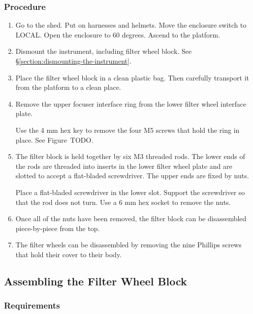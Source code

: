 \subsubsection{Procedure}

\begin{enumerate}

    \item Go to the shed. Put on harnesses and helmets. Move the enclosure switch to LOCAL. Open the enclosure to 60 degrees. Ascend to the platform.

    \item Dismount the instrument, including filter wheel block. See \S\ref{section:dismounting-the-instrument}.

   \item Place the filter wheel block in a clean plastic bag. Then carefully transport it from the platform to a clean place.
   
   \item Remove the upper focuser interface ring from the lower filter wheel interface plate. 
   
   Use the 4 mm hex key to remove the four M5 screws that hold the ring in place. See Figure~TODO.
   
  \item The filter block is held together by six M3 threaded rods. The lower ends of the rods are threaded into inserts in the lower filter wheel plate and are slotted to accept a flat-bladed screwdriver. The upper ends are fixed by nuts.
  
  Place a flat-bladed screwdriver in the lower slot. Support the screwdriver so that the rod does not turn. Use a 6 mm hex socket to remove the nuts.
  
  \item Once all of the nuts have been removed, the filter block can be disassembled piece-by-piece from the top.
  
 \item The filter wheels can be disassembled by removing the nine Phillips screws that hold their cover to their body.
  
\end{enumerate}

\subsection{Assembling the Filter Wheel Block}

\subsubsection{Requirements}


